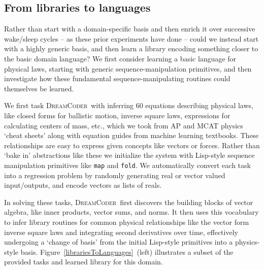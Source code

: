 \documentclass{article}
\newcommand{\system}{\textsc{DreamCoder}~}
\newcommand{\code}[1]{{\footnotesize\texttt{#1}}}
\begin{document}
\subsection{From libraries to languages}

Rather than start with a domain-specific basis and then enrich it over successive wake/sleep cycles -- as these prior experiments have done --
could we instead start with a highly generic basis,
and then learn a library encoding something closer to the basic domain language?
We first consider learning a basic language for physical laws,
starting with generic sequence-manipulation primitives,
and then investigate how these fundamental sequence-manipulating routines could themselves be learned.

We first task \system with inferring 60 equations describing physical laws,
like closed forms for ballistic motion, inverse square laws,
expressions for calculating centers of mass, etc.,
which we took from AP and MCAT physics `cheat sheets'
along with equation guides from machine learning textbooks.
These relationships are easy to express
given concepts like vectors or forces.
Rather than `bake in' abstractions like these we
initialize the system with Lisp-style sequence manipulation primitives like
\code{map} and \code{fold}.
We automatically convert each task into a
regression problem by randomly generating real or vector valued input/outputs,
and encode vectors as lists of reals.

In solving these tasks, \system first discovers the building blocks of vector algebra,
like inner products, vector sums, and norms.
It then uses this vocabulary to infer library routines for common
physical relationships like the vector form inverse square laws
and integrating second derivatives over time,
effectively undergoing a `change of basis' from the initial Lisp-style primitives into a
physics-style basis. Figure~\ref{librariesToLanguages}~(left) illustrates a subset
of the provided tasks and learned library for this domain. 
\end{document}
